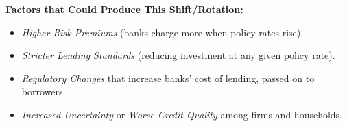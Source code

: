 \noindent
\textbf{Factors that Could Produce This Shift/Rotation:}
\begin{itemize}
    \item \emph{Higher Risk Premiums} (banks charge more when policy rates rise).
    \item \emph{Stricter Lending Standards} (reducing investment at any given policy rate).
    \item \emph{Regulatory Changes} that increase banks’ cost of lending, passed on to borrowers.
    \item \emph{Increased Uncertainty} or \emph{Worse Credit Quality} among firms and households.
\end{itemize}